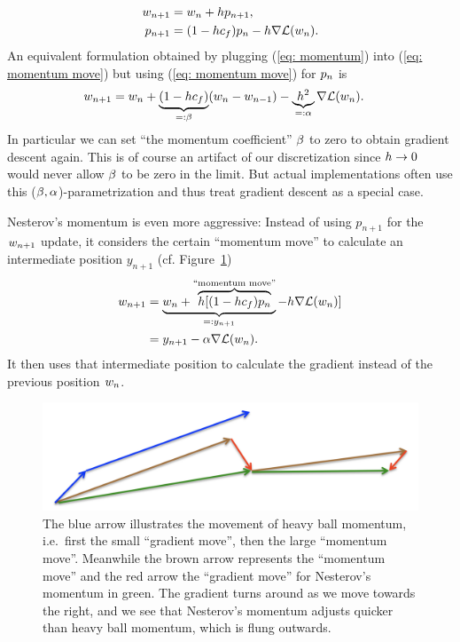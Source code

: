 \begin{definition}
	\begin{subequations}
	\begin{align}
		w_{n+1} &= w_n + h p_{n+1}, \label{eq: momentum move}\\
		p_{n+1} &= (1-hc_f)p_n - h\nabla \mathcal{L}(w_n).
		\label{eq: momentum}
	\end{align}
	\end{subequations}
	An equivalent formulation obtained by plugging (\ref{eq: momentum}) into
	(\ref{eq: momentum move}) but using (\ref{eq: momentum move}) for
	\(p_n\) is
	\begin{align}\label{eq: flat momentum}
		w_{n+1}
		&= w_n
		+ \underbrace{(1-hc_f)}_{
			=:\beta
		}(w_n - w_{n-1})
		- \underbrace{h^2}_{=:\alpha}\nabla \mathcal{L}(w_n).
	\end{align}
	In particular we can set ``the momentum coefficient'' \(\beta\) to zero to
	obtain gradient descent again. This is of course an artifact of our
	discretization since \(h\to0\) would never allow \(\beta\) to be zero
	in the limit. But actual implementations often use this
	(\(\beta,\alpha\))-parametrization and thus treat gradient descent as a
	special case.
\end{definition}
%
Nesterov's momentum is even more aggressive: Instead of using \(p_{n+1}\) for
the \(w_{n+1}\) update, it considers the certain ``momentum move''
to calculate an intermediate position \(y_{n+1}\) (cf. Figure~\ref{fig: hinton nesterov momentum})
%
\begin{align*}
	w_{n+1}
	&= \underbrace{w_n + \overbrace{h [(1-hc_f)p_n}^{\text{``momentum move''}}}_{=:y_{n+1}}
	- h\nabla \mathcal{L}(w_n)] \\
	&= y_{n+1} - \alpha \nabla \mathcal{L}(w_n).
\end{align*}
%
It then uses that intermediate position to calculate the gradient instead of the
previous position \(w_n\).
%
\begin{figure}[h]
	\centering
	\includegraphics[scale=0.5]{media/hinton_nesterov_momentum.png}
	\caption{
		\parencite[lecture 6c]{hintonNeuralNetworksMachine2012} The blue arrow
		illustrates the movement of heavy ball momentum, i.e.\ first the small
		``gradient move'', then the large ``momentum move''. Meanwhile the brown
		arrow represents the ``momentum move'' and the red arrow the ``gradient
		move'' for Nesterov's momentum in green. The gradient turns around as we
		move towards the right, and we see that Nesterov's momentum adjusts
		quicker than heavy ball momentum, which is flung outwards.
	}
	\label{fig: hinton nesterov momentum}
\end{figure}
